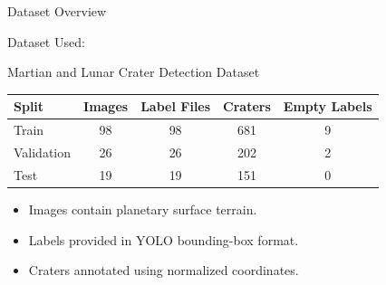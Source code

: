 \documentclass{beamer}
\begin{document}
	\begin{frame}{Dataset Overview}
		
		Dataset Used:
		
		\begin{center}
			Martian and Lunar Crater Detection Dataset
		\end{center}
		
		\vspace{0.4cm}
		
		\begin{table}[h]
			\centering
			\begin{tabular}{lcccc}
				\toprule
				Split & Images & Label Files & Craters & Empty Labels \\
				\midrule
				Train & 98 & 98 & 681 & 9 \\
				Validation & 26 & 26 & 202 & 2 \\
				Test & 19 & 19 & 151 & 0 \\
				\bottomrule
			\end{tabular}
		\end{table}
		
		\vspace{0.4cm}
		
		\begin{itemize}
			\item Images contain planetary surface terrain.
			\item Labels provided in YOLO bounding-box format.
			\item Craters annotated using normalized coordinates.
		\end{itemize}
		
	\end{frame}
	
\end{document}
